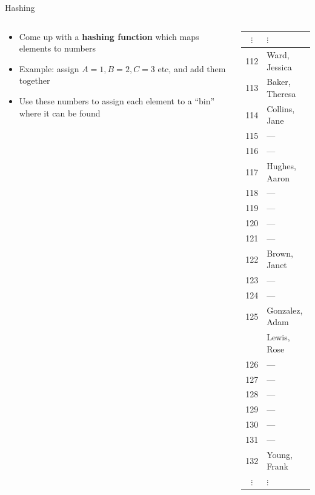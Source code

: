 \iffalse
\begin{frame}{Hashing}
	\begin{columns}
		\begin{column}{0.66\textwidth}
			\begin{itemize}
				\item Come up with a \textbf{hashing function} which maps elements to numbers \pause
				\item Example: assign $A=1, B=2, C=3$ etc, and add them together \pause
				\item Use these numbers to assign each element to a ``bin'' where it can be found \pause
			\end{itemize}
		\end{column}
		\begin{column}{0.3\textwidth}
			{\tiny
			\begin{tabular}{|c|l|}
$\vdots$ & $\vdots$ \\\hline
112 & Ward, Jessica \\\hline
113 & Baker, Theresa \\\hline
114 & Collins, Jane \\\hline
115 & --- \\\hline
116 & --- \\\hline
117 & Hughes, Aaron \\\hline
118 & --- \\\hline
119 & --- \\\hline
120 & --- \\\hline
121 & --- \\\hline
122 & Brown, Janet \\\hline
123 & --- \\\hline
124 & --- \\\hline
125 & Gonzalez, Adam \\ & Lewis, Rose \\\hline
126 & --- \\\hline
127 & --- \\\hline
128 & --- \\\hline
129 & --- \\\hline
130 & --- \\\hline
131 & --- \\\hline
132 & Young, Frank \\\hline
$\vdots$ & $\vdots$
			\end{tabular}
			}
		\end{column}
	\end{columns}
\end{frame}

